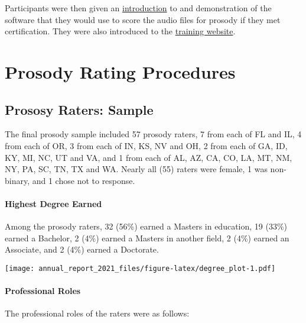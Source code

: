 \documentclass[
]{article}
\begin{document}
Participants were then given an
\href{https://jnese.github.io/CORE-II_trainingwebsite/CORE_training_session2day2_FINAL.pdf}{introduction}
to and demonstration of the software that they would use to score the
audio files for prosody if they met certification. They were also
introduced to the
\href{https://jnese.github.io/CORE-II_trainingwebsite/index.html}{training
website}.

\hypertarget{prosody-rating-procedures}{%
\section{Prosody Rating Procedures}\label{prosody-rating-procedures}}

\hypertarget{prososy-raters-sample}{%
\subsection{Prososy Raters: Sample}\label{prososy-raters-sample}}

The final prosody sample included 57 prosody raters, 7 from each of FL
and IL, 4 from each of OR, 3 from each of IN, KS, NV and OH, 2 from each
of GA, ID, KY, MI, NC, UT and VA, and 1 from each of AL, AZ, CA, CO, LA,
MT, NM, NY, PA, SC, TN, TX and WA. Nearly all (55) raters were female, 1
was non-binary, and 1 chose not to response.

\hypertarget{highest-degree-earned}{%
\paragraph{Highest Degree Earned}\label{highest-degree-earned}}

Among the prosody raters, 32 (56\%) earned a Masters in education, 19
(33\%) earned a Bachelor, 2 (4\%) earned a Masters in another field, 2
(4\%) earned an Associate, and 2 (4\%) earned a Doctorate.

\texttt{[image: annual\_report\_2021\_files/figure-latex/degree\_plot-1.pdf]}

\hypertarget{professional-roles}{%
\paragraph{Professional Roles}\label{professional-roles}}

The professional roles of the raters were as follows:
\end{document}
